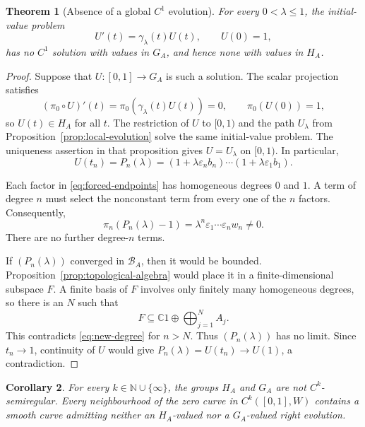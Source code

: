 \documentclass[11pt]{article}
\newtheorem{theorem}{Theorem}[section]
\newtheorem{corollary}[theorem]{Corollary}
\theoremstyle{remark}
\begin{document}
\begin{theorem}[Absence of a global $C^1$ evolution]
\label{thm:no-evolution}
For every $0<\lambda\leq1$, the initial-value problem
\[
  U'(t)=\gamma_\lambda(t)U(t),
  \qquad U(0)=1,
\]
has no $C^1$ solution with values in $G_A$, and hence none with values in
$H_A$.
\end{theorem}

\begin{proof}
Suppose that $U:[0,1]\to G_A$ is such a solution.  The scalar projection
satisfies
\[
  (\pi_0\circ U)'(t)=\pi_0(\gamma_\lambda(t)U(t))=0,
  \qquad \pi_0(U(0))=1,
\]
so $U(t)\in H_A$ for all $t$.  The restriction of $U$ to $[0,1)$ and the
path $U_\lambda$ from Proposition~\ref{prop:local-evolution} solve the same
initial-value problem.  The uniqueness assertion in that proposition gives
$U=U_\lambda$ on $[0,1)$.  In particular,
\begin{equation}
  U(t_n)=P_n(\lambda)
  =(1+\lambda\varepsilon_n b_n)\cdots
   (1+\lambda\varepsilon_1b_1).
  \label{eq:forced-endpoints}
\end{equation}

Each factor in \eqref{eq:forced-endpoints} has homogeneous degrees $0$ and
$1$.  A term of degree $n$ must select the nonconstant term from every one of
the $n$ factors.  Consequently,
\begin{equation}
  \pi_n(P_n(\lambda)-1)
  =\lambda^n\varepsilon_1\cdots\varepsilon_nw_n\neq0.
  \label{eq:new-degree}
\end{equation}
There are no further degree-$n$ terms.

If $(P_n(\lambda))$ converged in $\mathcal B_A$, then it would be bounded.
Proposition~\ref{prop:topological-algebra} would place it in a
finite-dimensional subspace $F$.  A finite basis of $F$ involves only
finitely many homogeneous degrees, so there is an $N$ such that
\[
  F\subseteq\mathbb C1\oplus\bigoplus_{j=1}^N A_j.
\]
This contradicts \eqref{eq:new-degree} for $n>N$.  Thus
$(P_n(\lambda))$ has no limit.  Since $t_n\to1$, continuity of $U$ would give
$P_n(\lambda)=U(t_n)\to U(1)$, a contradiction.
\end{proof}

\begin{corollary}
\label{cor:all-k}
For every $k\in\mathbb N\cup\{\infty\}$, the groups $H_A$ and $G_A$ are
not $C^k$-semiregular.  Every neighbourhood of the zero curve in
$C^k([0,1],W)$ contains a smooth curve admitting neither an $H_A$-valued nor
a $G_A$-valued right evolution.
\end{corollary}
\end{document}
